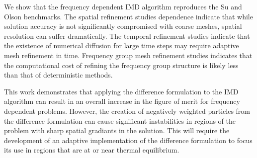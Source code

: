 	We show that the frequency dependent IMD algorithm reproduces the Su and Olson benchmarks. The spatial refinement studies dependence indicate that while solution accuracy is not significantly compromised with coarse meshes, spatial resolution can suffer dramatically. The temporal refinement studies indicate that the existence of numerical diffusion for large time steps may require adaptive mesh refinement in time. Frequency group mesh refinement studies indicates that the computational cost of refining the frequency group structure is likely less than that of deterministic methods.

	This work demonstrates that applying the difference formulation to the IMD algorithm can result in an overall increase in the figure of merit for frequency dependent problems. However, the creation of negatively weighted particles from the difference formulation can cause significant instabilities in regions of the problem with sharp spatial gradiants in the solution. This will require the development of an adaptive implementation of the difference formulation to focus its use in regions that are at or near thermal equilibrium.

\thispagestyle{empty}
